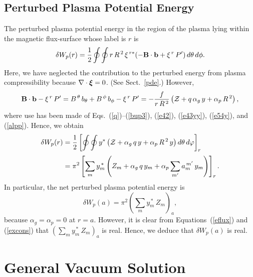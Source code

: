 \documentclass[12pt,prb,aps]{revtex4-1}
\newcommand {\bxi}{\mbox{\boldmath$\xi$}}
\begin{document}
\subsection{Perturbed Plasma Potential Energy}
The perturbed plasma potential energy in the region of the plasma lying within the magnetic flux-surface whose label is $r$ is\,\cite{tj1,gs1}
\begin{equation}
\delta W_p(r) = \frac{1}{2}\oint\oint r\,R^{\,2}\,\xi^{\,r\ast}(-{\bf B}\cdot{\bf b} + \xi^{\,r}\,P')\,d\theta\,d\phi.
\end{equation}
Here, we have neglected the contribution to the perturbed energy from plasma compressibility because $\nabla\cdot\bxi= 0$. (See Sect.~\ref{pde}.)
However,
\begin{equation}
{\bf B}\cdot{\bf b} -\xi^{\,r}\,P' = B^{\,\theta}\,b_\theta+B^{\,\phi}\,b_\phi - \xi^{\,r}\,P'
= - \frac{f}{r\,R^{\,2}}\left({\cal Z} + q\,\alpha_g\,y + \alpha_p\,R^{\,2}\right),
\end{equation}
where use has been made of Eqs.~(\ref{q})--(\ref{bup3}), (\ref{e42}), (\ref{e43yy}), (\ref{e54y}),  and (\ref{alpp}). Hence,
we obtain
\begin{align}\label{e87j}
\delta W_p(r) &=\frac{1}{2}\left[\oint\oint y^{\ast}\left({\cal Z} + \alpha_g \,q\,y+ \alpha_p\,R^{\,2}\, y\right)d\theta\,d\varphi\right]_r\nonumber\\[0.5ex]
&=\pi^2\left[\sum_{m}y_m^{\,\ast}\left(Z_m + \alpha_g \,q\,y_m+ \alpha_p\sum_{m'}a_m^{\,m'}\, y_m\right)\right]_r.
\end{align}
 In particular,  the net perturbed plasma potential energy is 
 \begin{equation}\label{e7.34yi}
 \delta W_p(a) =  \pi^2\left(\sum_{m}y_m^{\,\ast}\,Z_m \right)_a,
 \end{equation}
 because $\alpha_g=\alpha_p =0$ at $r=a$. However, it is clear from Equations~(\ref{eflux}) and (\ref{excons}) that $(\sum_m y_m^{\,\ast}\,Z_m)_a$ is real. 
 Hence, we deduce that $\delta W_p(a)$ is real. 

\section{General Vacuum Solution}\label{vacuum}
\end{document}
